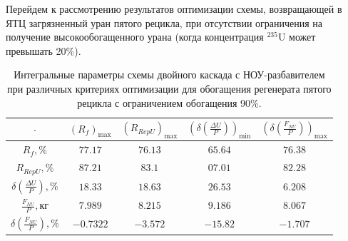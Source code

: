 Перейдем к рассмотрению результатов оптимизации схемы, возвращающей в ЯТЦ загрязненный уран пятого рецикла, при отсутствии ограничения на получение высокообогащенного урана (когда концентрация $^{235}$U может превышать 20\%).

\begin{table}
    \begin{tabular}{ccccc}
    $\cdot$ & $(R_f)_\text{max}$ & $(R_{RepU})_\text{max}$ & $(\delta(\frac{\Delta U}{P}))_\text{min}$ & $(\delta(\frac{F_{NU}}{P}))_\text{max}$\\ \hline
    $R_f, \%$ & $77.17$ & $76.13$ & $65.64$ & $76.38$\\ \hline
    $R_{RepU}, \%$  & $87.21$ & $83.1$ & $07.01$ & $82.28$\\ \hline
    $\delta(\frac{\Delta U}{P}), \%$ & $18.33$ & $18.63$ & $26.53$ & $6.208$\\ \hline
    $\frac{F_{NU}}{P}, \text{кг}$ & $7.989$ & $8.215$ & $9.186$ & $8.067$\\ \hline
    $\delta(\frac{F_{NU}}{P}), \%$ & $-0.7322$ & $-3.572$ & $-15.82$ & $-1.707$\\ \hline
\end{tabular}
\caption{Интегральные параметры схемы двойного каскада с НОУ-разбавителем при различных критериях оптимизации для обогащения регенерата пятого рецикла с ограничением обогащения 90\%.{\label{2opt5_90_int}}}
\end{table}

